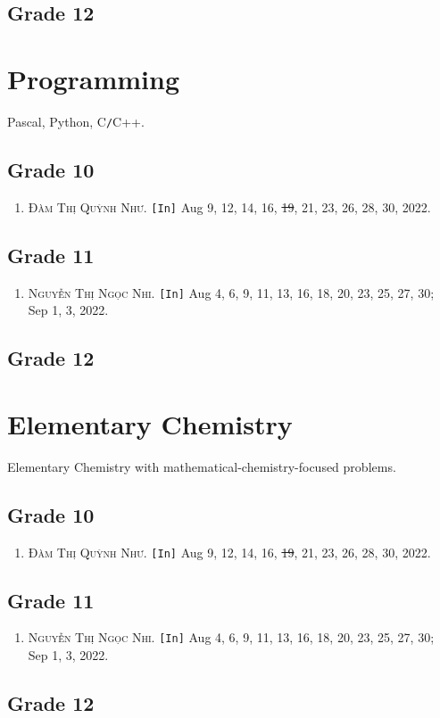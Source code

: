 \documentclass{article}
\numberwithin{equation}{section}
\begin{document}
\subsection{Grade 12}

\section{Programming}
Pascal, Python, C\texttt{/}C++.

\subsection{Grade 10}
\begin{enumerate}
	\item \textsc{Đàm Thị Quỳnh Như.} \texttt{[In]} Aug 9, 12, 14, 16, \st{19}, 21, 23, 26, 28, 30, 2022.
\end{enumerate}

\subsection{Grade 11}
\begin{enumerate}
	\item \textsc{Nguyễn Thị Ngọc Nhi.} \texttt{[In]} Aug 4, 6, 9, 11, 13, 16, 18, 20, 23, 25, 27, 30; Sep 1, 3, 2022.
\end{enumerate}

\subsection{Grade 12}

\section{Elementary Chemistry}
Elementary Chemistry with mathematical-chemistry-focused problems.

\subsection{Grade 10}
\begin{enumerate}
	\item \textsc{Đàm Thị Quỳnh Như.} \texttt{[In]} Aug 9, 12, 14, 16, \st{19}, 21, 23, 26, 28, 30, 2022.
\end{enumerate}

\subsection{Grade 11}
\begin{enumerate}
	\item \textsc{Nguyễn Thị Ngọc Nhi.} \texttt{[In]} Aug 4, 6, 9, 11, 13, 16, 18, 20, 23, 25, 27, 30; Sep 1, 3, 2022.
\end{enumerate}

\subsection{Grade 12}


\printbibliography[heading=bibintoc]
	
\end{document}
